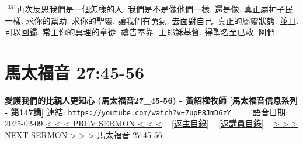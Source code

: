 \documentclass{book}
\begin{document}
$^{1361}$再次反思我們是一個怎樣的人.
我們是不是像他們一樣.
還是像.
真正屬神子民一樣.
求你的幫助.
求你的聖靈.
讓我們有勇氣.
去面對自己.
真正的屬靈狀態.
並且.
可以回歸.
常主你的真理的童從.
禱告奉靠.
主耶穌基督.
得聖名至已救.
阿們.
\newpage



\section{馬太福音 27:45-56}
\label{sec:7upP8JmD6zY}
\textbf{愛護我們的比親人更知心 (馬太福音27\_45-56) - 黃紹權牧師  [馬太福音信息系列 - 第147講]}
\newline
\newline
連結: \href{https://youtube.com/watch?v=7upP8JmD6zY}{\texttt{https://youtube.com/watch?v=7upP8JmD6zY}} ~~~~ 語音日期: 2025-02-09
\newline
\newline
\hyperref[sec:oCpi7n8ictU]{< < < PREV SERMON < < <}
~
\hyperlink{toc}{[返主目錄]}
~
\hyperref[ch:preacher18]{[返講員目錄]}
~
\hyperref[sec:MfR5_HAo14I]{> > > NEXT SERMON > > >}
\newline
\newline
馬太福音 27:45-56
\newline
\end{document}
